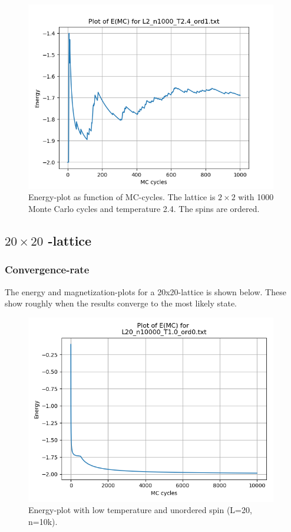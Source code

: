 \documentclass{article}
\begin{document}
  \begin{figure}[ht]
      \centering
      \includegraphics[width = 11cm]{img/energy_L2_n1000_T24_ord1.png}
      \caption{Energy-plot as function of MC-cycles. The lattice is $2 \times 2$ with 1000 Monte Carlo cycles and temperature 2.4. The spins are ordered. }
      \label{fig:energy_L2_n1000_T2.4_ord1}
    \end{figure}

\subsection{\texorpdfstring{ $20 \times 20$ }{text}-lattice} \label{sec:20x20lattice}

\subsubsection{Convergence-rate} \label{sec:convergence}

The energy and magnetization-plots for a 20x20-lattice is shown below. These show roughly when the results converge to the most likely state. \\


    \begin{figure}[ht]
      \centering
      \includegraphics[width = 11cm]{img/energy_L20_n10000_T10_ord0.png}
      \caption{Energy-plot with low temperature and unordered spin (L=20, n=10k).}
      \label{fig:L20-energy-lowT-ord0}
    \end{figure}
\end{document}
